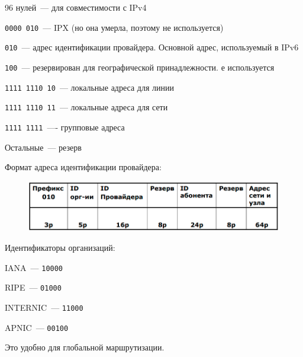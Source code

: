 \begin{MyItemize}
    \item 96 нулей~--- для совместимости с IPv4
    \item {\tt 0000 010}~--- IPX (но она умерла, поэтому не используется)
    \item {\tt 010}~--- адрес идентификации провайдера. Основной адрес, используемый в IPv6
    \item {\tt 100}~--- резервирован для географической принадлежности. е используется
    \item {\tt 1111 1110 10}~--- локальные адреса для линии
    \item {\tt 1111 1110 11}~--- локальные адреса для сети
    \item {\tt 1111 1111}~---- групповые адреса
    \item Остальные~--- резерв
\end{MyItemize}

Формат адреса идентификации провайдера:

\begin{figure}[H]
  \centering
  \includegraphics[width=15cm]{images/08/02}
\end{figure}

Идентификаторы организаций:
\begin{MyItemize}
    \item IANA~--- {\tt 10000}
    \item RIPE~--- {\tt 01000}
    \item INTERNIC~--- {\tt 11000}
    \item APNIC~--- {\tt 00100}
\end{MyItemize}

Это удобно для глобальной маршрутизации.

